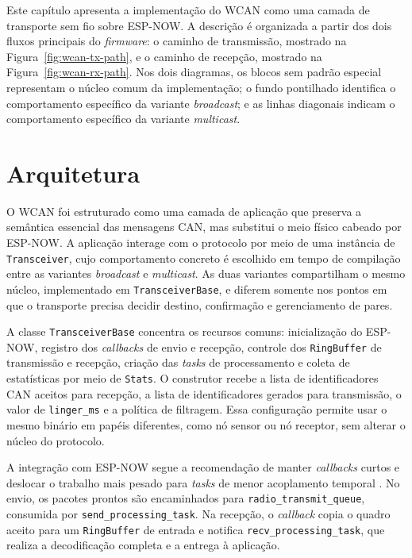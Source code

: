 Este capítulo apresenta a implementação do WCAN como uma camada de transporte
sem fio sobre ESP-NOW. A descrição é organizada a partir dos dois fluxos
principais do \emph{firmware}: o caminho de transmissão, mostrado na
Figura~\ref{fig:wcan-tx-path}, e o caminho de recepção, mostrado na
Figura~\ref{fig:wcan-rx-path}. Nos dois diagramas, os blocos sem padrão especial
representam o núcleo comum da implementação; o fundo pontilhado identifica o
comportamento específico da variante \emph{broadcast}; e as linhas diagonais indicam o
comportamento específico da variante \emph{multicast}.

\section{Arquitetura}

O WCAN foi estruturado como uma camada de aplicação que preserva a semântica
essencial das mensagens CAN, mas substitui o meio físico cabeado por ESP-NOW. A
aplicação interage com o protocolo por meio de uma instância de
\texttt{Transceiver}, cujo comportamento concreto é escolhido em tempo de
compilação entre as variantes \emph{broadcast} e \emph{multicast}. As duas variantes
compartilham o mesmo núcleo, implementado em \texttt{TransceiverBase}, e diferem
somente nos pontos em que o transporte precisa decidir destino, confirmação e
gerenciamento de pares.

A classe \texttt{TransceiverBase} concentra os recursos comuns: inicialização do
ESP-NOW, registro dos \emph{callbacks} de envio e recepção, controle dos
\texttt{RingBuffer} de transmissão e recepção, criação das \emph{tasks} de processamento
e coleta de estatísticas por meio de \texttt{Stats}. O construtor recebe a lista
de identificadores CAN aceitos para recepção, a lista de identificadores gerados
para transmissão, o valor de \texttt{linger\_ms} e a política de filtragem. Essa
configuração permite usar o mesmo binário em papéis diferentes, como nó sensor ou
nó receptor, sem alterar o núcleo do protocolo.

A integração com ESP-NOW segue a recomendação de manter \emph{callbacks} curtos e
deslocar o trabalho mais pesado para \emph{tasks} de menor acoplamento temporal
\cite{espressif_espnow_programming_guide}. No envio, os pacotes prontos são
encaminhados para \texttt{radio\_transmit\_queue}, consumida por
\texttt{send\_processing\_task}. Na recepção, o \emph{callback} copia o quadro aceito
para um \texttt{RingBuffer} de entrada e notifica \texttt{recv\_processing\_task},
que realiza a decodificação completa e a entrega à aplicação.


